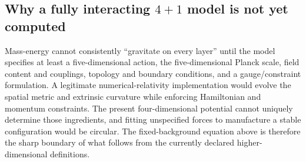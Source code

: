
\subsection{Why a fully interacting $4+1$ model is not yet computed}
Mass-energy cannot consistently ``gravitate on every layer'' until the model specifies at least a five-dimensional action, the five-dimensional Planck scale, field content and couplings, topology and boundary conditions, and a gauge/constraint formulation. A legitimate numerical-relativity implementation would evolve the spatial metric and extrinsic curvature while enforcing Hamiltonian and momentum constraints. The present four-dimensional potential cannot uniquely determine those ingredients, and fitting unspecified forces to manufacture a stable configuration would be circular. The fixed-background equation above is therefore the sharp boundary of what follows from the currently declared higher-dimensional definitions.

